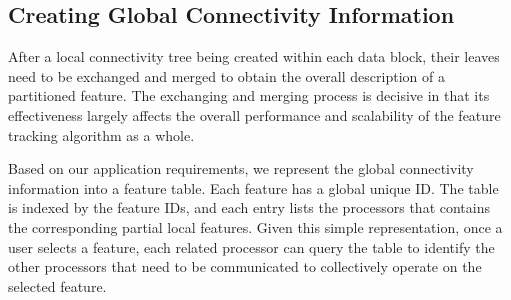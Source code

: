 % 
% 			
% 
% 

\subsection{Creating Global Connectivity Information}

After a local connectivity tree being created within each data block, their leaves need to be exchanged and merged to obtain the overall description of a partitioned feature. The exchanging and merging process is decisive in that its effectiveness largely affects the overall performance and scalability of the feature tracking algorithm as a whole.

Based on our application requirements, we represent the global connectivity information into a feature table. Each feature has a global unique ID. The table is indexed by the feature IDs, and each entry lists the processors that contains the corresponding partial local features. Given this simple representation, once a user selects a feature, each related processor can query the table to identify the other processors that need to be communicated to collectively operate on the selected feature.


